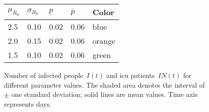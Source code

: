\documentclass{article}
\newcommand{\infected}{I}
\newcommand{\intensive}{IN}
\newcommand{\reproduction}{R_0}
\newcommand{\ICUpercentage}{p}
\begin{document}
\begin{figure}
    \centering
    
    
    \begin{tabular}{lllll}
        \toprule
        $\mu_{\reproduction}$ & $\sigma_{\reproduction}$ & $\underline{\ICUpercentage}$ & $\overline{\ICUpercentage}$ & Color\\
        \midrule
        2.5 & 0.10 & 0.02 & 0.06 & blue \\
        2.0 & 0.15 & 0.02 & 0.06 & orange\\
        1.5 & 0.10 & 0.02 & 0.06 & green \\
        \bottomrule
    \end{tabular}
    \caption{Number of infected people~$\infected(t)$ and \gls{icu} patients~$\intensive(t)$ for different parameter values.
     The shaded area denotes the interval of $\pm$ one standard deviation; solid lines are mean values.
     Time axis represents days.}
    \label{fig:SimulationStudy}
\end{figure}


\printbibliography
\end{document}
